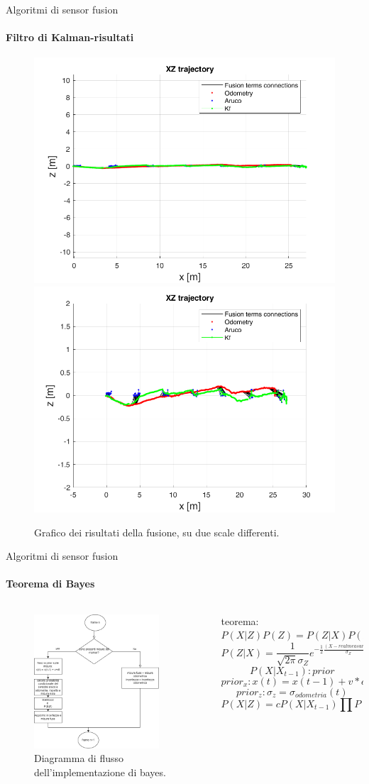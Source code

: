 \documentclass{beamer}
\begin{document}
\begin{frame}{Algoritmi di sensor fusion}
\framesubtitle{Filtro di Kalman-risultati}
    \begin{figure}
        \centering
        \includegraphics[width=.4\textwidth]{images/kfexpaxeq.png}
        \includegraphics[width=.4\textwidth]{images/kfexp.png}
        \caption{Grafico dei risultati della fusione, su due scale differenti.}
    \end{figure}
\end{frame}

\begin{frame}{Algoritmi di sensor fusion}
\framesubtitle{Teorema di Bayes}
\begin{columns}
    \begin{column}{0.6\textwidth}
    \begin{figure}
        \centering
        \includegraphics[height=5cm]{images/flowchart BAyes.png}
        \caption{Diagramma di flusso dell'implementazione di bayes.}
    \end{figure}
    \end{column}
    \begin{column}{0.4\textwidth}
    teorema: $P(X|Z)P(Z) = P(Z|X)P(X)$
    $$P(Z|X)=\frac{1}{\sqrt{2\pi}\sigma_{Z}} e^{-\frac{1}{2}\frac{(X-realmeasure)^{2}}{\sigma_{Z}}}$$
    $$P(X|X_{t-1}): prior$$
    $$prior_{x}: x(t) = x(t-1) + v*dt, \sigma_{x} = 0.7$$
    $$prior_{z}: \sigma_{z} = \sigma_{odometria}(t)$$
    $$P(X|Z) =c P(X|X_{t-1})\prod{P(z_{i}|X)}$$
\end{column}
\end{columns}
\end{frame}
\end{document}
